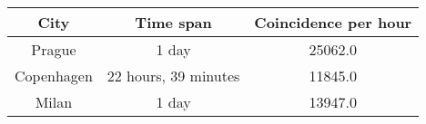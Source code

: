 \begin{tabular}{ccc}
\toprule
City & Time span & Coincidence per hour\\
\midrule
Prague & 1 day & 25062.0\\
Copenhagen & 22 hours, 39 minutes & 11845.0\\
Milan & 1 day & 13947.0\\
\bottomrule
\end{tabular}
